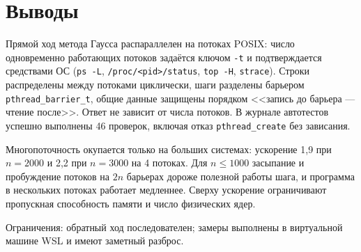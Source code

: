 \section{Выводы}

Прямой ход метода Гаусса распараллелен на потоках POSIX: число одновременно
работающих потоков задаётся ключом \texttt{-t} и подтверждается средствами ОС
(\texttt{ps -L}, \texttt{/proc/<pid>/status}, \texttt{top -H}, \texttt{strace}).
Строки распределены между потоками циклически, шаги разделены барьером
\texttt{pthread\_barrier\_t}, общие данные защищены порядком <<запись до
барьера --- чтение после>>. Ответ не зависит от числа потоков. В журнале
автотестов успешно выполнены 46 проверок, включая отказ \texttt{pthread\_create}
без зависания.

Многопоточность окупается только на больших системах: ускорение 1,9 при
$n = 2000$ и 2,2 при $n = 3000$ на 4 потоках. Для $n \le 1000$ засыпание и
пробуждение потоков на $2n$ барьерах дороже полезной работы шага, и программа
в нескольких потоках работает медленнее. Сверху ускорение ограничивают
пропускная способность памяти и число физических ядер.

Ограничения: обратный ход последователен; замеры выполнены в виртуальной машине
WSL и имеют заметный разброс.
